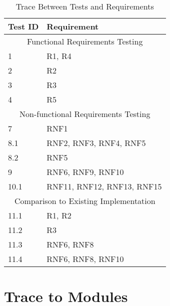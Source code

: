 \documentclass[12pt, titlepage]{article}
\begin{document}
\begin{table}[H!]
\centering
\begin{tabular}{p{} p{}}
\toprule
\textbf{Test ID} & \textbf{Requirement}\\
\midrule
\multicolumn{2}{c}{Functional Requirements Testing} \\
\midrule
1 & R1, R4 \\
2 & R2 \\
3 & R3 \\
4 & R5 \\

\midrule
\multicolumn{2}{c}{Non-functional Requirements Testing} \\
\midrule

7 & RNF1\\
8.1 & RNF2, RNF3, RNF4, RNF5\\
8.2 & RNF5\\
9 &  RNF6, RNF9, RNF10\\
10.1 & RNF11, RNF12, RNF13, RNF15\\
\midrule
\multicolumn{2}{c}{Comparison to Existing Implementation} \\
\midrule
11.1 & R1, R2\\
11.2 & R3\\
11.3 & RNF6, RNF8\\
11.4 & RNF6, RNF8, RNF10\\
\bottomrule
\end{tabular}
\caption{Trace Between Tests and Requirements}
\end{table}
		
\section{Trace to Modules} %
\end{document}

